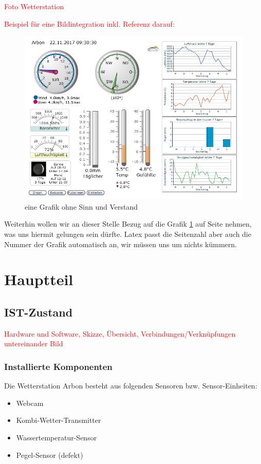 \documentclass[a4paper,ngerman, 11pt, pagesize]{report}
\newcommand\Diskussionspunkt[1]{\textcolor{red}{#1}}
\begin{document}
\Diskussionspunkt{Foto Wetterstation}


\Diskussionspunkt{Beispiel für eine Bildintegration inkl. Referenz darauf:}
\begin{figure}[htbp]
	\centering
	\includegraphics[width=0.9\linewidth]{img/grafik}
	\caption{eine Grafik ohne Sinn und Verstand}
	\label{img:grafik-dummy}
\end{figure}

Weiterhin wollen wir an dieser Stelle Bezug auf die Grafik
\ref{img:grafik-dummy} auf Seite \pageref{img:grafik-dummy} nehmen, was uns
hiermit gelungen sein dürfte. Latex passt die Seitenzahl aber auch die Nummer
der Grafik automatisch an, wir müssen uns um nichts kümmern.

\chapter{Hauptteil}

\section{IST-Zustand}
\Diskussionspunkt{Hardware und Software, Skizze, Übersicht, Verbindungen/Verknüpfungen untereinander}
\Diskussionspunkt{Bild}

\subsection{Installierte Komponenten}

Die Wetterstation Arbon besteht aus folgenden Sensoren bzw. Sensor-Einheiten:
\begin{itemize}  
\item Webcam
\item Kombi-Wetter-Transmitter
\item Wassertemperatur-Sensor
\item Pegel-Sensor (defekt)
\end{itemize}
\end{document}
